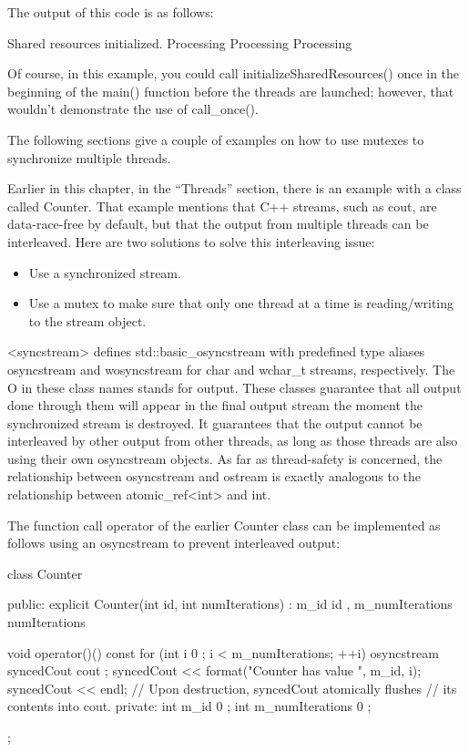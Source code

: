 The output of this code is as follows:

\begin{shell}
Shared resources initialized.
Processing
Processing
Processing
\end{shell}

Of course, in this example, you could call initializeSharedResources() once in the beginning of the main() function before the threads are launched; however, that wouldn’t demonstrate the use of call\_once().


The following sections give a couple of examples on how to use mutexes to synchronize multiple threads.


Earlier in this chapter, in the “Threads” section, there is an example with a class called Counter. That example mentions that C++ streams, such as cout, are data-race-free by default, but that the output from multiple threads can be interleaved. Here are two solutions to solve this interleaving issue:

\begin{itemize}
\item
Use a synchronized stream.

\item
Use a mutex to make sure that only one thread at a time is reading/writing to the stream object.
\end{itemize}


<syncstream> defines std::basic\_osyncstream with predefined type aliases osyncstream and wosyncstream for char and wchar\_t streams, respectively. The O in these class names stands for output. These classes guarantee that all output done through them will appear in the final output stream the moment the synchronized stream is destroyed. It guarantees that the output cannot be interleaved by other output from other threads, as long as those threads are also using their own osyncstream objects. As far as thread-safety is concerned, the relationship between osyncstream and ostream is exactly analogous to the relationship between atomic\_ref<int> and int.

The function call operator of the earlier Counter class can be implemented as follows using an osyncstream to prevent interleaved output:

\begin{cpp}
class Counter
{
    public:
        explicit Counter(int id, int numIterations)
            : m_id { id }, m_numIterations { numIterations } { }

        void operator()() const
        {
            for (int i { 0 }; i < m_numIterations; ++i) {
                osyncstream syncedCout { cout };
                syncedCout << format("Counter {} has value {}", m_id, i);
                syncedCout << endl;
                // Upon destruction, syncedCout atomically flushes
                // its contents into cout.
            }
        }
    private:
        int m_id { 0 };
        int m_numIterations { 0 };
};
\end{cpp}

